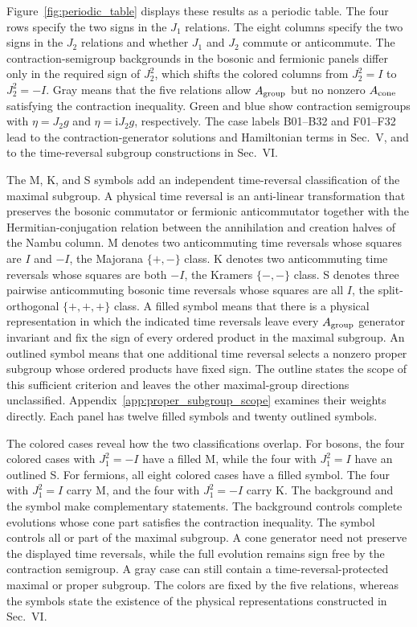 \documentclass[onecolumn,aps,prb,amsmath,amssymb,superscriptaddress,longbibliography,floatfix]{revtex4-2}
\newcommand{\ii}{\mathrm{i}}
\begin{document}
Figure~\ref{fig:periodic_table} displays these results as a periodic table.  The
four rows specify the two signs in the \(J_1\) relations.  The eight columns
specify the two signs in the \(J_2\) relations and whether \(J_1\) and \(J_2\)
commute or anticommute.  The contraction-semigroup backgrounds in the bosonic
and fermionic panels differ only in the required sign of \(J_2^2\), which
shifts the colored columns from
\(J_2^2=I\) to \(J_2^2=-I\).  Gray means that the five relations allow
\(A_{\rm group}\) but no nonzero \(A_{\rm cone}\) satisfying the contraction
inequality.  Green and blue show contraction semigroups with \(\eta=J_2g\) and
\(\eta=\ii J_2g\), respectively.  The case labels B01--B32 and F01--F32 lead
to the contraction-generator solutions and Hamiltonian terms in Sec.~V, and to
the time-reversal subgroup constructions in Sec.~VI.

The M, K, and S symbols add an independent time-reversal classification of the
maximal subgroup.  A physical time reversal is an anti-linear transformation
that preserves the bosonic commutator or fermionic anticommutator together with
the Hermitian-conjugation relation between the annihilation and creation halves
of the Nambu column.  M denotes two anticommuting time
reversals whose squares are \(I\) and \(-I\), the Majorana \(\{+,-\}\) class.
K denotes two anticommuting time reversals whose squares are both \(-I\), the
Kramers \(\{-,-\}\) class.  S denotes three pairwise anticommuting bosonic time
reversals whose squares are all \(I\), the split-orthogonal \(\{+,+,+\}\)
class.  A filled symbol means that there is a physical representation in which
the indicated time reversals leave every \(A_{\rm group}\) generator invariant
and fix the sign of every ordered product in the maximal subgroup.  An outlined
symbol means that one additional time reversal selects a nonzero proper subgroup
whose ordered products have fixed sign.  The outline states the scope of this
sufficient criterion and leaves the other maximal-group directions unclassified.
Appendix~\ref{app:proper_subgroup_scope} examines their weights directly.  Each
panel has twelve filled symbols and twenty outlined symbols.

The colored cases reveal how the two classifications overlap.  For bosons, the
four colored cases with \(J_1^2=-I\) have a filled M, while the four with
\(J_1^2=I\) have an outlined S.  For fermions, all eight colored cases have a
filled symbol.  The four with \(J_1^2=I\) carry M, and the four with
\(J_1^2=-I\) carry K.  The background and the symbol make complementary
statements.  The background controls complete evolutions whose cone part
satisfies the contraction inequality.  The symbol controls all or part of the
maximal subgroup.  A cone generator need not preserve the displayed time
reversals, while the full evolution remains sign free by the contraction
semigroup.  A gray case can still contain a time-reversal-protected maximal or
proper subgroup.  The colors are fixed by the five relations, whereas the
symbols state the existence of the physical representations constructed in
Sec.~VI.
\end{document}
